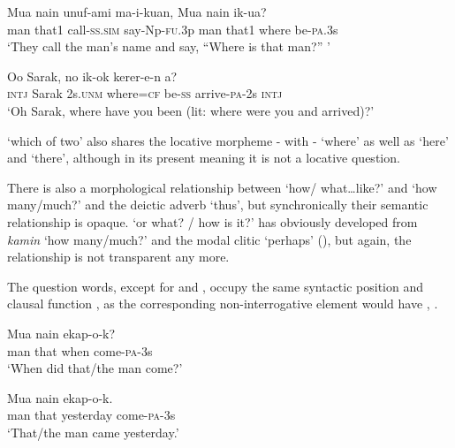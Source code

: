 \ea%
\label{ex:3:x1852}
\gll Mua nain unuf-ami ma-i-kuan, {\textquotedbl}Mua nain  ik-ua?{\textquotedbl} \\
man that1 call-\textsc{ss}.\textsc{sim} say-Np-\textsc{fu}.3p man that1 where be-\textsc{pa}.3s\\
\glt`They call the man's name and say, ``Where is that man?'' '
\z

\ea%
\label{ex:3:x1854}
\gll Oo Sarak, no  ik-ok kerer-e-n a? \\
\textsc{intj} Sarak 2s.\textsc{unm} where=\textsc{cf} be-\textsc{ss} arrive-\textsc{pa}-2s \textsc{intj}\\
\glt`Oh Sarak, where have you been (lit: where were you and arrived)?'
\z

 `which of two' also shares the locative morpheme - with - `where' as well as  `here' and  `there', although in its present meaning it is not a locative question.

There is also a morphological relationship between  `how/ what{\dots}like?' and  `how many/much?' and the deictic adverb  `thus', but synchronically their semantic relationship is opaque.  `or what? / how is it?' has obviously developed from \textit{kamin} `how many/much?' and the modal clitic  `perhaps' (), but again, the relationship is not transparent any more.

The question words, except for  and , occupy the same syntactic position and clausal function ,  as the corresponding non-interrogative element would have , .

\ea%
\label{ex:3:x520}
\gll Mua nain  ekap-o-k? \\
man that when come-\textsc{pa}-3s\\
\glt`When did that/the man come?'
\z

\ea%
\label{ex:3:x647}
\gll Mua nain  ekap-o-k. \\
man that yesterday come-\textsc{pa}-3s\\
\glt`That/the man came yesterday.'
\z

